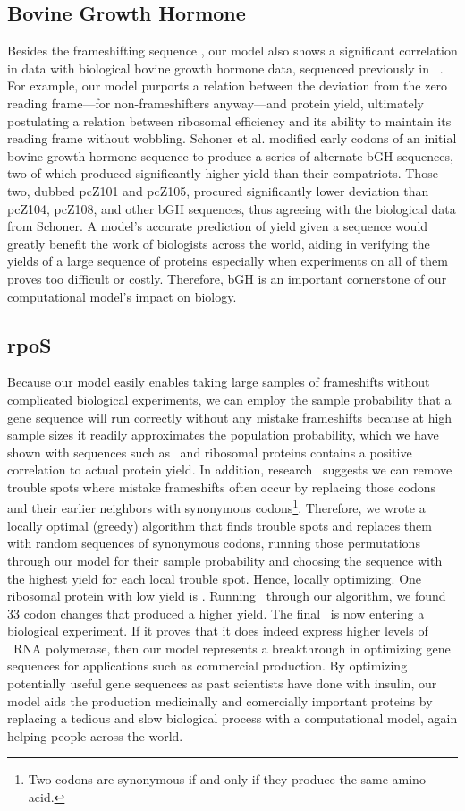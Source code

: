 \documentclass[12pt, draft]{article}
\begin{document}
\subsection{Bovine Growth Hormone}
Besides the frameshifting sequence \prfB, our model also shows a significant correlation in data with biological
bovine growth hormone data, sequenced previously in \ecoli~\cite{schoner:bgh}. For example, our model purports a relation
between the deviation from the zero reading frame---for non-frameshifters anyway---and protein yield, ultimately postulating
a relation between ribosomal efficiency and its ability to maintain its reading frame without wobbling. Schoner et al.
modified early codons of an initial bovine growth hormone sequence to produce a series of alternate bGH sequences,
two of which produced significantly higher yield than their compatriots. Those two, dubbed pcZ101 and pcZ105, procured significantly
lower deviation than pcZ104, pcZ108, and other bGH sequences, thus agreeing with the biological data from Schoner.
A model's accurate prediction of yield given a sequence would greatly benefit the work of biologists across the world,
aiding in verifying the yields of a large sequence of proteins especially when experiments on all of them proves too difficult
or costly. Therefore, bGH is an important cornerstone of our computational model's impact on biology.

\subsection{rpoS}
Because our model easily enables taking large samples of frameshifts without complicated biological experiments,
we can employ the sample probability that a gene sequence will run correctly without any mistake frameshifts because
at high sample sizes it readily approximates the population probability, which we have shown with sequences such as
\prfB\ and ribosomal proteins contains a positive correlation to actual protein yield. In addition, research~\cite{rare:yield}
suggests we can remove trouble spots where mistake frameshifts often occur by replacing those codons and their
earlier neighbors with synonymous codons\footnote{Two codons are synonymous if and only if they produce the same amino acid.}.
Therefore, we wrote a locally optimal (greedy) algorithm that finds trouble spots and replaces them with random sequences
of synonymous codons, running those permutations through our model for their sample probability and choosing the
sequence with the highest yield for each local trouble spot. Hence, locally optimizing. One ribosomal protein with
low yield is \rpoS. Running \rpoS\ through our algorithm, we found 33 codon changes that produced a higher yield.
The final \rpoS\ is now entering a biological experiment. If it proves that it does indeed express higher levels
of \rpoS\ RNA polymerase, then our model represents a breakthrough in optimizing gene sequences for applications
such as commercial production. By optimizing potentially useful gene sequences as past scientists have done with
insulin, our model aids the production medicinally and comercially important proteins by replacing a tedious and slow
biological process with a computational model, again helping people across the world.

\footnotesize
\begin{singlespace}
  
\end{singlespace}
\end{document}
